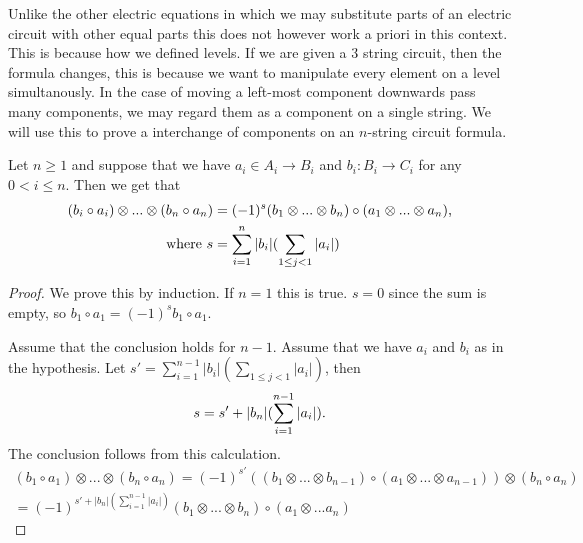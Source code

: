 \documentclass[../thesis.tex]{subfiles}
\begin{document}
            Unlike the other electric equations in which we may substitute parts of an electric circuit with other equal parts this does not however work a priori in this context. This is because how we defined levels. If we are given a 3 string circuit, then the formula changes, this is because we want to manipulate every element on a level simultanously. In the case of moving a left-most component downwards pass many components, we may regard them as a component on a single string. We will use this to prove a interchange of components on an $n$-string circuit formula.
            
            \begin{proposition}
                Let $n \geq 1$ and suppose that we have $a_i\in A_i \rightarrow B_i$ and $b_i: B_i \rightarrow C_i$ for any $0 < i \leq n $. Then we get that
                \begin{align*}
                    (b_i\circ a_i) \otimes ... \otimes (b_n \circ a_n) & = (-1)^s(b_1 \otimes ... \otimes b_n)\circ (a_1 \otimes ... \otimes a_n)\tt{,} \\
                    \tt{where } s & = \sum_{i=1}^n|b_i|(\sum_{1\leq j < 1}|a_i|)
                \end{align*}
            \end{proposition}

            \begin{proof}
                We prove this by induction. If $n=1$ this is true. $s = 0$ since the sum is empty, so $b_1 \circ a_1  =(-1)^s b_1 \circ a_1$.
                
                Assume that the conclusion holds for $n-1$. Assume that we have $a_i$ and $b_i$ as in the hypothesis. Let $s' = \sum_{i=1}^{n-1}|b_i|(\sum_{1\leq j < 1}|a_i|)$, then
                \begin{align*}
                    s = s' + |b_n|(\sum_{i = 1}^{n-1}|a_i|)\tt{.}
                \end{align*}
                The conclusion follows from this calculation.
                \begin{multline*}
                    (b_1 \circ a_1) \otimes ... \otimes (b_n \circ a_n) = (-1)^{s'}((b_1 \otimes ... \otimes b_{n-1}) \circ (a_1 \otimes ... \otimes a_{n-1})) \otimes (b_n \circ a_n) \\ = (-1)^{s' + |b_n|(\sum_{i = 1}^{n-1}|a_i|)}(b_1 \otimes ... \otimes b_n) \circ (a_1 \otimes ... a_n)
                \end{multline*}
            \end{proof}
\end{document}
